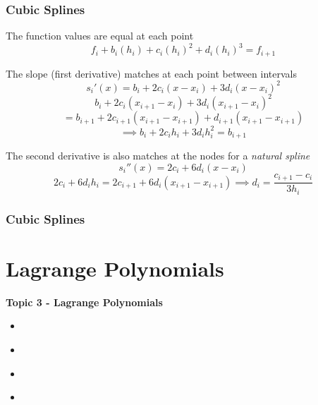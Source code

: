 \documentclass[fleqn]{beamer} %
\newcommand{\sectionIVtitle}{Lagrange Polynomials}
\newcommand{\sectionIIIsubsectionIVtitle}{Cubic Splines}
\newcommand{\sectionIVsubsectionItitle}{}
\newcommand{\sectionIVsubsectionIItitle}{}
\newcommand{\sectionIVsubsectionIIItitle}{}
\newcommand{\sectionIVsubsectionIVtitle}{}
\begin{document}
			\begin{frame}
				\frametitle{\sectionIIIsubsectionIVtitle} \small
				\bigskip
        
        The function values are equal at each point
        \[f_i+b_i\left(h_i\right)+c_i\left(h_i\right)^2+d_i\left(h_i\right)^3=f_{i+1}\]
      
        The slope (first derivative) matches at each point between intervals 
        \[s_i'\left(x\right)=b_i+2c_i\left(x-x_i\right)+3d_i\left(x-x_i\right)^2\]
        \[b_i+2c_i\left(x_{i+1}-x_i\right)+3d_i\left(x_{i+1}-x_i\right)^2\]
        \[= b_{i+1}+2c_{i+1}\left(x_{i+1}-x_{i+1}\right)+d_{i+1}\left(x_{i+1}-x_{i+1}\right)\] 
        \[\implies b_i+2c_ih_i+3d_ih_i^2=b_{i+1}\]
  
        The second derivative is also matches at the nodes for a {\it natural spline} 
        \[s_i''\left(x\right)=2c_i+6d_i\left(x-x_i\right)\]
        \[2c_i + 6d_ih_i=2c_{i+1} + 6d_i\left(x_{i+1}-x_{i+1}\right) \implies d_i=\frac{c_{i+1}-c_i}{3h_i}\]

        \btVFill
			\end{frame}	
	
			\begin{frame}
				\frametitle{\sectionIIIsubsectionIVtitle} \small
				\bigskip


				\btVFill
			\end{frame}	

	\section{\sectionIVtitle}\label{sectionIV}

		\begin{frame}
			\large \textbf{Topic 3 - \sectionIVtitle} \vspace{3mm}\\

			\begin{itemize}
				\item \hyperlink{sectionIVsubsectionI}{\sectionIVsubsectionItitle} \vspc %
				\item \hyperlink{sectionIVsubsectionII}{\sectionIVsubsectionIItitle} \vspc %
				\item \hyperlink{sectionIVsubsectionIII}{\sectionIVsubsectionIIItitle} \vspc %
				\item \hyperlink{sectionIVsubsectionIV}{\sectionIVsubsectionIVtitle} \vspc %
			\end{itemize}

		\end{frame}
\end{document}
